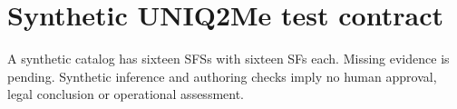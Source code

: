 \section{Synthetic UNIQ2Me test contract}
A synthetic catalog has sixteen SFSs with sixteen SFs each. Missing evidence is
pending. Synthetic inference and authoring checks imply no human approval,
legal conclusion or operational assessment.
